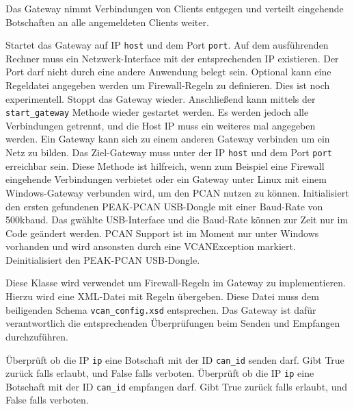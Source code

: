 \begin{description}
    Das Gateway nimmt Verbindungen von Clients entgegen und verteilt eingehende Botschaften an alle angemeldeten Clients weiter.
    \begin{description}
        Startet das Gateway auf IP \texttt{host} und dem Port \texttt{port}. Auf dem ausführenden Rechner muss ein Netzwerk-Interface mit der entsprechenden IP existieren. Der Port darf nicht durch eine andere Anwendung belegt sein. Optional kann eine Regeldatei angegeben werden um Firewall-Regeln zu definieren. Dies ist noch experimentell.
        Stoppt das Gateway wieder. Anschließend kann mittels der \texttt{start\_gateway} Methode wieder gestartet werden. Es werden jedoch alle Verbindungen getrennt, und die Host IP muss ein weiteres mal angegeben werden.
        Ein Gateway kann sich zu einem anderen Gateway verbinden um ein Netz zu bilden. Das Ziel-Gateway muss unter der IP \texttt{host} und dem Port \texttt{port} erreichbar sein. Diese Methode ist hilfreich, wenn zum Beispiel eine Firewall eingehende Verbindungen verbietet oder ein Gateway unter Linux mit einem Windows-Gateway verbunden wird, um den PCAN nutzen zu können.
        Initialisiert den ersten gefundenen PEAK-PCAN USB-Dongle mit einer Baud-Rate von 500kbaud. Das gwählte USB-Interface und die Baud-Rate können zur Zeit nur im Code geändert werden. PCAN Support ist im Moment nur unter Windows vorhanden und wird ansonsten durch eine VCANException markiert.
        Deinitialisiert den PEAK-PCAN USB-Dongle.
    \end{description}
\end{description}

\begin{description}
    Diese Klasse wird verwendet um Firewall-Regeln im Gateway zu implementieren. Hierzu wird eine XML-Datei mit Regeln übergeben. Diese Datei muss dem beiligenden Schema \texttt{vcan\_config.xsd} entsprechen. Das Gateway ist dafür verantwortlich die entsprechenden Überprüfungen beim Senden und Empfangen durchzuführen.
    \begin{description}
        Überprüft ob die IP \texttt{ip} eine Botschaft mit der ID \texttt{can\_id} senden darf. Gibt True zurück falls erlaubt, und False falls verboten.
        Überprüft ob die IP \texttt{ip} eine Botschaft mit der ID \texttt{can\_id} empfangen darf. Gibt True zurück falls erlaubt, und False falls verboten.
    \end{description}
\end{description}

